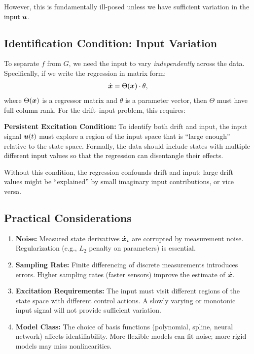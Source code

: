 However, this is fundamentally ill-posed unless we have sufficient variation in the input $\bm{u}$.

\subsection{Identification Condition: Input Variation}

To separate $f$ from $G$, we need the input to vary \emph{independently} across the data.
Specifically, if we write the regression in matrix form:
\begin{equation}
\dot{\bm{x}} = \Theta(\bm{x}) \cdot \theta,
\end{equation}
where $\Theta(\bm{x})$ is a regressor matrix and $\theta$ is a parameter vector, then $\Theta$ must
have full column rank. For the drift--input problem, this requires:

\begin{axiombox}
\textbf{Persistent Excitation Condition:} To identify both drift and input, the input signal
$\bm{u}(t)$ must explore a region of the input space that is ``large enough'' relative to the
state space. Formally, the data should include states with multiple different input values so
that the regression can disentangle their effects.
\end{axiombox}

Without this condition, the regression confounds drift and input: large drift values might be
``explained'' by small imaginary input contributions, or vice versa.

\subsection{Practical Considerations}

\begin{enumerate}
\item \textbf{Noise:} Measured state derivatives $\dot{\bm{x}}_i$ are corrupted by measurement noise.
      Regularization (e.g., $L_2$ penalty on parameters) is essential.
\item \textbf{Sampling Rate:} Finite differencing of discrete measurements introduces errors.
      Higher sampling rates (faster sensors) improve the estimate of $\dot{\bm{x}}$.
\item \textbf{Excitation Requirements:} The input must visit different regions of the state
      space with different control actions. A slowly varying or monotonic input signal will
      not provide sufficient variation.
\item \textbf{Model Class:} The choice of basis functions (polynomial, spline, neural network)
      affects identifiability. More flexible models can fit noise; more rigid models may miss
      nonlinearities.
\end{enumerate}

